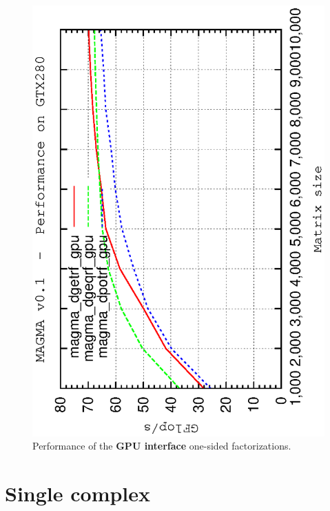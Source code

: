 \documentclass[10pt]{book}
\begin{document}
       \begin{figure}[!ht]
          \centering
          \hspace{-5mm}
          \includegraphics[angle=-90,scale=0.7]{dp-gpu.ps}
          \caption{Performance of the {\bf GPU interface} 
                   one-sided factorizations.}
       \label{dp-gpu-performance}
       \end{figure}

\newpage
\section{Single complex}
\end{document}
